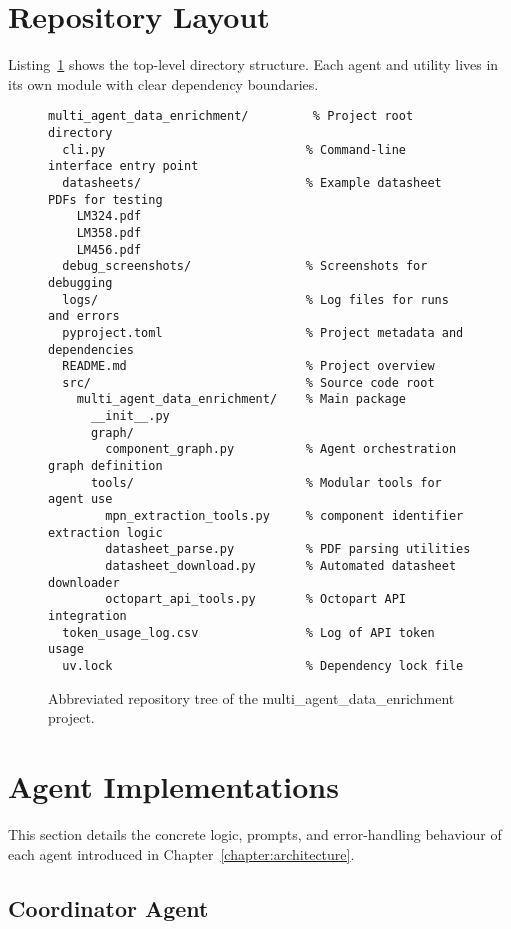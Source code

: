\section{Repository Layout}
Listing~\ref{lst:tree} shows the top-level directory structure.  Each agent and utility lives in its own module with clear dependency boundaries.
\begin{figure}[H]
\centering
\begin{minipage}{0.9\textwidth}
\begin{verbatim}
multi_agent_data_enrichment/         % Project root directory
  cli.py                            % Command-line interface entry point
  datasheets/                       % Example datasheet PDFs for testing
    LM324.pdf
    LM358.pdf
    LM456.pdf
  debug_screenshots/                % Screenshots for debugging
  logs/                             % Log files for runs and errors
  pyproject.toml                    % Project metadata and dependencies
  README.md                         % Project overview 
  src/                              % Source code root
    multi_agent_data_enrichment/    % Main package
      __init__.py
      graph/
        component_graph.py          % Agent orchestration graph definition
      tools/                        % Modular tools for agent use
        mpn_extraction_tools.py     % component identifier extraction logic
        datasheet_parse.py          % PDF parsing utilities
        datasheet_download.py       % Automated datasheet downloader
        octopart_api_tools.py       % Octopart API integration
  token_usage_log.csv               % Log of API token usage
  uv.lock                           % Dependency lock file
\end{verbatim}
\end{minipage}
\caption{Abbreviated repository tree of the multi\_agent\_data\_enrichment project.}
\label{lst:tree}
\end{figure}

\section{Agent Implementations}
This section details the concrete logic, prompts, and error-handling behaviour of each agent introduced in Chapter~\ref{chapter:architecture}.

\subsection{Coordinator Agent}

